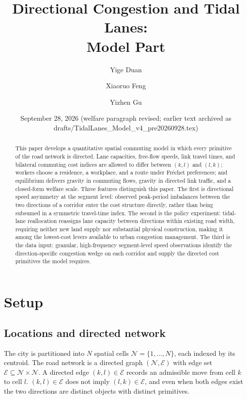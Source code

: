 \documentclass[12pt]{article}
\title{Directional Congestion and Tidal Lanes:\\
Model Part}
\author{Yige Duan \and Xiaoruo Feng \and Yizhen Gu}
\date{September 28, 2026 (welfare paragraph revised; earlier text archived as drafts/TidalLanes\_Model\_v4\_pre20260928.tex)}
\newcommand{\N}{\mathcal N}
\newcommand{\E}{\mathcal E}
\begin{document}
\maketitle

\begin{abstract}
\noindent
This paper develops a quantitative spatial commuting model in which every primitive of the road network is directed. Lane capacities, free-flow speeds, link travel times, and bilateral commuting cost indices are allowed to differ between $(k,l)$ and $(l,k)$; workers choose a residence, a workplace, and a route under Fréchet preferences; and equilibrium delivers gravity in commuting flows, gravity in directed link traffic, and a closed-form welfare scale. Three features distinguish this paper. The first is directional speed asymmetry at the segment level: observed peak-period imbalances between the two directions of a corridor enter the cost structure directly, rather than being subsumed in a symmetric travel-time index. The second is the policy experiment: tidal-lane reallocation reassigns lane capacity between directions within existing road width, requiring neither new land supply nor substantial physical construction, making it among the lowest-cost levers available to urban congestion management. The third is the data input: granular, high-frequency segment-level speed observations identify the direction-specific congestion wedge on each corridor and supply the directed cost primitives the model requires.
\end{abstract}

\tableofcontents
\clearpage

\section{Setup}\label{sec:setup}

\subsection{Locations and directed network}

The city is partitioned into $N$ spatial cells $\N=\{1,\dots,N\}$,
each indexed by its centroid.  The road network is a directed graph
$(\N,\E)$ with edge set $\E\subseteq\N\times\N$.  A directed edge
$(k,l)\in\E$ records an admissible move from cell $k$ to cell $l$.
$(k,l)\in\E$ does not imply $(l,k)\in\E$, and even when both edges
exist the two directions are distinct objects with distinct
primitives.
\end{document}
